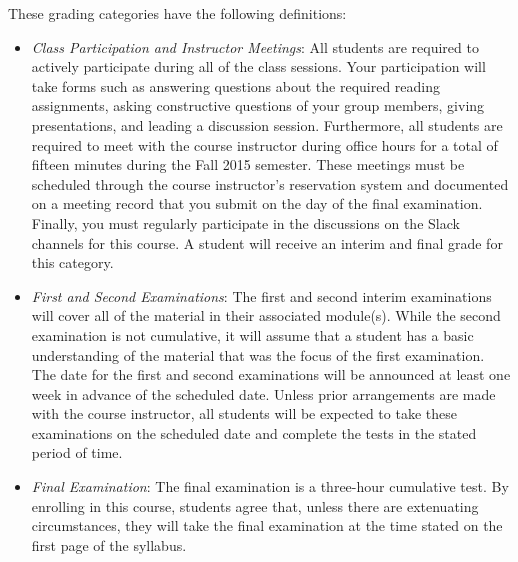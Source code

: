 \vspace*{-.1in}
\noindent
These grading categories have the following definitions:
\vspace*{-.1in}

\begin{itemize}

    \item {\em Class Participation and Instructor Meetings}: All students are required to actively participate during
      all of the class sessions. Your participation will take forms such as answering questions about the required
      reading assignments, asking constructive questions of your group members, giving presentations, and leading a
      discussion session. Furthermore, all students are required to meet with the course instructor during office hours
      for a total of fifteen minutes during the Fall 2015 semester.  These meetings must be scheduled through the course
      instructor's reservation system and documented on a meeting record that you submit on the day of the final
      examination. Finally, you must regularly participate in the discussions on the Slack channels for this course. A
      student will receive an interim and final grade for this category.

    \item {\em First and Second Examinations}: The first and second interim examinations will cover all of the material
        in their associated module(s).  While the second examination is not cumulative, it will assume that a student has a
        basic understanding of the material that was the focus of the first examination.  The date for the first and
        second examinations will be announced at least one week in advance of the scheduled date.  Unless prior
        arrangements are made with the course instructor, all students will be expected to take these examinations on the
        scheduled date and complete the tests in the stated period of time.

    \item {\em Final Examination}: The final examination is a three-hour cumulative test.  By enrolling in this course,
        students agree that, unless there are extenuating circumstances, they will take the final examination at the
        time stated on the first page of the syllabus.


\end{itemize}
